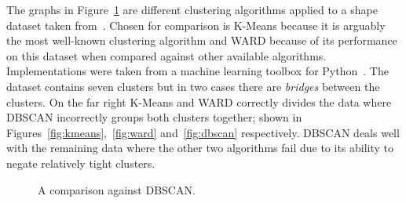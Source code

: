 \documentclass{ecsarticle}     %
\begin{document}
The graphs in Figure~\ref{fig:compare} are different clustering algorithms applied to a shape dataset taken from~\cite{gionis05cluster}.
Chosen for comparison is K-Means because it is arguably the most well-known clustering algorithm and WARD because of its performance on this dataset when compared against other available algorithms.
Implementations were taken from a machine learning toolbox for Python~\citep{scikit13ml}.
The dataset contains seven clusters but in two cases there are \emph{bridges} between the clusters.
On the far right K-Means and WARD correctly divides the data where DBSCAN incorrectly groups both clusters together; shown in Figures~\ref{fig:kmeans},~\ref{fig:ward} and~\ref{fig:dbscan} respectively.
DBSCAN deals well with the remaining data where the other two algorithms fail due to its ability to negate relatively tight clusters.

\begin{figure}[ht]
   \centering
   \caption{A comparison against DBSCAN.}
   \label{fig:compare}
\end{figure}
\end{document}
